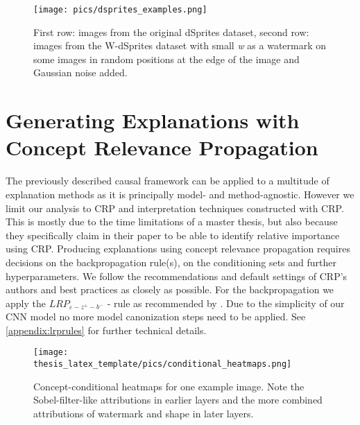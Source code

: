 \begin{figure}[H]
    \centering
    \texttt{[image: pics/dsprites\_examples.png]}
    \caption[Example Images W-dSprites]{First row: images from the original dSprites dataset, second row: images from the W-dSprites dataset with small \textit{w} as a watermark on some images in random positions at the edge of the image and Gaussian noise added.}
    \label{fig:dsprites_examples}
\end{figure}

\section{Generating Explanations with Concept Relevance Propagation}
The previously described causal framework can be applied to a multitude of explanation methods as it is principally model- and method-agnostic. However we limit our analysis to CRP and interpretation techniques constructed with CRP. This is mostly due to the time limitations of a master thesis, but also because they specifically claim in their paper to be able to identify relative importance using CRP. 
Producing explanations using concept relevance propagation requires decisions on the backpropagation rule(s), on the conditioning sets and further hyperparameters. 
We follow the recommendations and default settings of CRP's authors \cite{Achtibat2022, Achtibat2023} and best practices \cite{Kohlbrenner2020} as closely as possible.
For the backpropagation we apply the $LRP_{\varepsilon -z^+- b^-}$ - rule as recommended by \cite{Kohlbrenner2020}. Due to the simplicity of our CNN model no more model canonization steps need to be applied. See \cref{appendix:lrprules} for further technical details. 

\begin{figure}
    \centering
    \texttt{[image: thesis\_latex\_template/pics/conditional\_heatmaps.png]}
    \caption[Comparing Attribution Maps of Layers]{Concept-conditional heatmaps for one example image. Note the Sobel-filter-like attributions in earlier layers and the more combined attributions of watermark and shape in later layers.}
    \label{fig:cc_heatmaps}
\end{figure}

